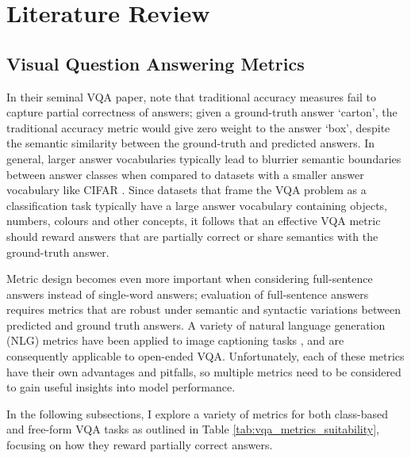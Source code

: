 \chapter{Literature Review}
\label{chapter:literature}



\section{Visual Question Answering Metrics}

In their seminal VQA paper, \citeauthor{malinowski2014multiworld} \cite{malinowski2014multiworld} note that traditional accuracy measures fail to capture partial correctness of answers; given a ground-truth answer `carton', the traditional accuracy metric would give zero weight to the answer `box', despite the semantic similarity between the ground-truth and predicted answers. In general, larger answer vocabularies typically lead to blurrier semantic boundaries between answer classes when compared to datasets with a smaller answer vocabulary like CIFAR \cite{krizhevsky2009learning}. Since datasets that frame the VQA problem as a classification task typically have a large answer vocabulary containing objects, numbers, colours and other concepts, it follows that an effective VQA metric should reward answers that are partially correct or share semantics with the ground-truth answer.

Metric design becomes even more important when considering full-sentence answers instead of single-word answers; evaluation of full-sentence answers requires metrics that are robust under semantic and syntactic variations between predicted and ground truth answers. A variety of natural language generation (NLG) metrics \cite{papineni2002bleu, lin2004rouge, banerjee2005meteor, vedantam2015cider} have been applied to image captioning tasks \cite{chen2015microsoft}, and are consequently applicable to open-ended VQA. Unfortunately, each of these metrics have their own advantages and pitfalls, so multiple metrics need to be considered to gain useful insights into model performance.


In the following subsections, I explore a variety of metrics for both class-based and free-form VQA tasks as outlined in Table \ref{tab:vqa_metrics_suitability}, focusing on how they reward partially correct answers.



